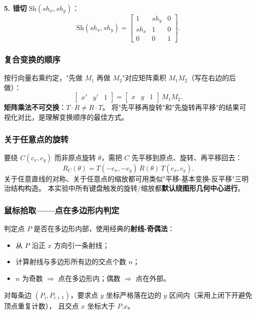 \documentclass[a4paper,12pt]{ctexart}
\begin{document}
\textbf{5. 错切} $\mathrm{Sh}(sh_x,sh_y)$：
\[
    \mathrm{Sh}(sh_x,sh_y) =
    \begin{bmatrix}
        1   & sh_y & 0 \\
        sh_x& 1    & 0 \\
        0   & 0    & 1
    \end{bmatrix}.
\]

\subsubsection{复合变换的顺序}

按行向量右乘约定，"先做 $M_1$ 再做 $M_2$"对应矩阵乘积 $M_1 M_2$（写在右边的后做）：
\[
    \begin{bmatrix} x' & y' & 1 \end{bmatrix}
    =
    \begin{bmatrix} x & y & 1 \end{bmatrix}\,M_1 M_2.
\]
\textbf{矩阵乘法不可交换}：$T\cdot R \ne R\cdot T$。
将"先平移再旋转"和"先旋转再平移"的结果可视化对比，是理解变换顺序的最佳方式。

\subsubsection{关于任意点的旋转}

要绕 $C(c_x,c_y)$ 而非原点旋转 $\theta$，需把 $C$ 先平移到原点、旋转、再平移回去：
\[
    R_C(\theta) = T(-c_x,-c_y)\, R(\theta)\, T(c_x,c_y) .
\]
关于任意直线的对称、关于任意点的缩放都可用类似"平移-基本变换-反平移"三明治结构构造。
本实验中所有键盘触发的旋转/缩放都\textbf{默认绕图形几何中心进行}。

\subsubsection{鼠标拾取——点在多边形内判定}

判定点 $P$ 是否在多边形内部，使用经典的\textbf{射线-奇偶法}：
\begin{itemize}[leftmargin=2em,itemsep=0.1em]
    \item 从 $P$ 沿正 $x$ 方向引一条射线；
    \item 计算射线与多边形所有边的交点个数 $n$；
    \item $n$ 为奇数 $\Rightarrow$ 点在多边形内；偶数 $\Rightarrow$ 点在外部。
\end{itemize}
对每条边 $(P_i,P_{i+1})$，要求点 $y$ 坐标严格落在边的 $y$ 区间内（采用上闭下开避免顶点重复计数），
且交点 $x$ 坐标大于 $P.x$。
\end{document}
